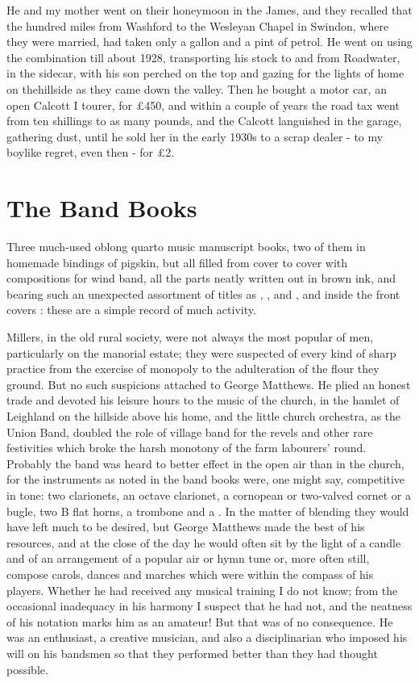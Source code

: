 He and my mother went on their honeymoon in the James, and they recalled that the hundred miles from Washford to the Wesleyan Chapel in Swindon, where they were married, had taken only a gallon and a pint of petrol. He went on using the combination till about 1928, transporting his stock to and from Roadwater, in the sidecar, with his son perched on the top and gazing for the lights of home on thehillside as they came down the valley. Then he bought a motor car, an open Calcott I tourer, for £450, and within a couple of years the road tax went from ten shillings to as many pounds, and the Calcott languished in the garage, gathering dust, until he sold her in the early 1930s to a scrap dealer - to my boylike regret, even then - for £2.
 
\section{The Band Books}

Three much-used oblong quarto music manuscript books, two of them in homemade bindings of pigskin, but all filled from cover to cover with compositions for wind band, all the parts neatly written out in brown ink, and bearing such an unexpected assortment of titles as , ,  and , and inside the front covers : these are a simple record of much activity.

Millers, in the old rural society, were not always the most popular of men, particularly on the manorial estate; they were suspected of every kind of sharp practice from the exercise of monopoly to the adulteration of the flour they ground. But no such suspicions attached to George Matthews. He plied an honest trade and devoted his leisure hours to the music of the church, in the hamlet of Leighland on the hillside above his home, and the little church orchestra, as the Union Band, doubled the role of village band for the revels and other rare festivities which broke the harsh monotony of the farm labourers’ round. Probably the band was heard to better effect in the open air than in the church, for the instruments as noted in the band books were, one might say, competitive in tone: two clarionets, an octave clarionet, a cornopean or two-valved cornet or a bugle, two B flat horns, a trombone and a . In the matter of blending they would have left much to be desired, but George Matthews made the best of his resources, and at the close of the day he would often sit by the light of a candle and  of an arrangement of a popular air or hymn tune or, more often still, compose carols, dances and marches which were within the compass of his players. Whether he had received any musical training I do not know; from the occasional inadequacy in his harmony I suspect that he had not, and the neatness of his notation marks him as an amateur! But that was of no consequence. He was an enthusiast, a creative musician, and also a disciplinarian who imposed his will on his bandsmen so that they performed better than they had thought possible.

